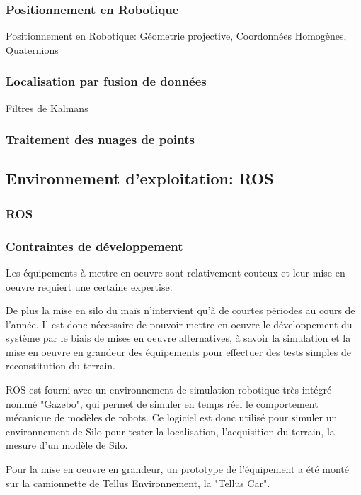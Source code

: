 \documentclass[12pt,a4paper]{report}
\begin{document}
			\subsubsection{Positionnement en Robotique}
		Positionnement en Robotique: Géometrie projective, Coordonnées Homogènes, Quaternions
			
			\subsubsection{Localisation par fusion de données}
		Filtres de Kalmans
		
			\subsubsection{Traitement des nuages de points}
			
		\subsection{Environnement d'exploitation: ROS}
			\subsubsection{ROS}
			
			\subsubsection{Contraintes de développement}
				Les équipements à mettre en oeuvre sont relativement couteux et leur mise en oeuvre requiert une certaine expertise.
				
				De plus la mise en silo du maïs n'intervient qu'à de courtes périodes au cours de l'année. Il est donc nécessaire de pouvoir mettre en oeuvre le développement du système par le biais de mises en oeuvre alternatives, à savoir la simulation et la mise en oeuvre en grandeur des équipements pour effectuer des tests simples de reconstitution du terrain.
				
				ROS est fourni avec un environnement de simulation robotique très intégré nommé "Gazebo", qui permet de simuler en temps réel le comportement mécanique de modèles de robots. Ce logiciel est donc utilisé pour simuler un environnement de Silo pour tester la localisation, l'acquisition du terrain, la mesure d'un modèle de Silo.
				
				Pour la mise en oeuvre en grandeur, un prototype de l'équipement a été monté sur la camionnette de Tellus Environnement, la "Tellus Car".
				
\end{document}
